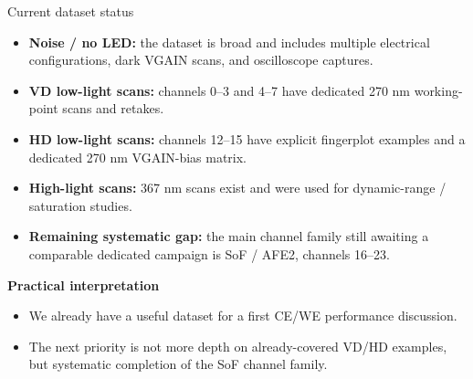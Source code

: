 \documentclass[aspectratio=169]{beamer}
\begin{document}
\begin{frame}{Current dataset status}
\footnotesize
\begin{itemize}
  \item \textbf{Noise / no LED:} the dataset is broad and includes multiple electrical configurations, dark VGAIN scans, and oscilloscope captures.
  \item \textbf{VD low-light scans:} channels 0--3 and 4--7 have dedicated 270 nm working-point scans and retakes.
  \item \textbf{HD low-light scans:} channels 12--15 have explicit fingerplot examples and a dedicated 270 nm VGAIN-bias matrix.
  \item \textbf{High-light scans:} 367 nm scans exist and were used for dynamic-range / saturation studies.
  \item \textbf{Remaining systematic gap:} the main channel family still awaiting a comparable dedicated campaign is SoF / AFE2, channels 16--23.
\end{itemize}

\vspace{1mm}
\textbf{Practical interpretation}
\begin{itemize}
  \item We already have a useful dataset for a first CE/WE performance discussion.
  \item The next priority is not more depth on already-covered VD/HD examples, but systematic completion of the SoF channel family.
\end{itemize}
\end{frame}
\end{document}
